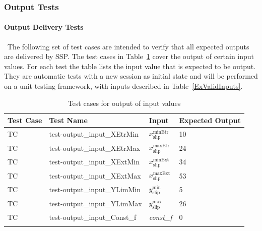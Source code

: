\documentclass[12pt, titlepage]{article}
\newcounter{testnum} %
\newcommand{\progname}{SSP}
\begin{document}
\subsubsection{Output Tests}

\paragraph{Output Delivery Tests}

~\newline \noindent The following set of test cases are intended to 
verify that all expected outputs are delivered by \progname{}. The test cases 
in Table~\ref{OutputInputTests} cover the output of certain input values. For 
each test the table lists the input value that is expected to be output. They 
are automatic tests with a new session as initial state and will be performed 
on a unit testing framework, with inputs described in Table~\ref{ExValidInputs}.

\begin{longtable}{  l  p{5cm}  l  p{5cm}  }
	\hline
	\textbf{Test Case} & \textbf{Test Name} & \textbf{Input} & \textbf{Expected 
	Output} \\
	\hline
	TC{testnum}\thetestnum \label{TC_OutputInputXEtrMin} & 
	test-output\_input\_XEtrMin &  ${x_\text{slip}^\text{minEtr}}$ & 10\\ 
	\hline
	TC{testnum}\thetestnum \label{TC_OutputInputXEtrMax} & 
	test-output\_input\_XEtrMax &  ${x_\text{slip}^\text{maxEtr}}$ & 24\\ 
	\hline
	TC{testnum}\thetestnum \label{TC_OutputInputXExtMin} & 
	test-output\_input\_XExtMin &  ${x_\text{slip}^\text{minExt}}$ & 34\\ 
	\hline
	TC{testnum}\thetestnum \label{TC_OutputInputXExtMax} & 
	test-output\_input\_XExtMax &  ${x_\text{slip}^\text{maxExt}}$ & 53\\ 
	\hline
	TC{testnum}\thetestnum \label{TC_OutputInputYlimMin} & 
	test-output\_input\_YLimMin &  ${y_\text{slip}^\text{min}}$ & 5\\ 
	\hline
	TC{testnum}\thetestnum \label{TC_OutputInputYlimMax} & 
	test-output\_input\_YLimMax &  ${y_\text{slip}^\text{max}}$ & 26\\ 
	\hline
	TC{testnum}\thetestnum \label{TC_OutputInputConstf} & 
	test-output\_input\_Const\_f &  \textit{const\_f} & 0\\ 
	\hline
	\caption{Test cases for output of input values}
	\label{OutputInputTests}
\end{longtable}
\end{document}
